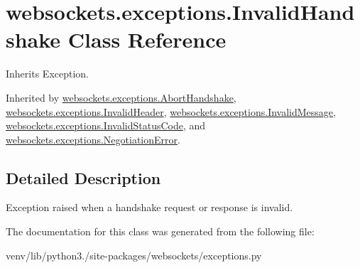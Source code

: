 \hypertarget{classwebsockets_1_1exceptions_1_1_invalid_handshake}{}\section{websockets.\+exceptions.\+Invalid\+Handshake Class Reference}
\label{classwebsockets_1_1exceptions_1_1_invalid_handshake}


Inherits Exception.



Inherited by \hyperlink{classwebsockets_1_1exceptions_1_1_abort_handshake}{websockets.\+exceptions.\+Abort\+Handshake}, \hyperlink{classwebsockets_1_1exceptions_1_1_invalid_header}{websockets.\+exceptions.\+Invalid\+Header}, \hyperlink{classwebsockets_1_1exceptions_1_1_invalid_message}{websockets.\+exceptions.\+Invalid\+Message}, \hyperlink{classwebsockets_1_1exceptions_1_1_invalid_status_code}{websockets.\+exceptions.\+Invalid\+Status\+Code}, and \hyperlink{classwebsockets_1_1exceptions_1_1_negotiation_error}{websockets.\+exceptions.\+Negotiation\+Error}.



\subsection{Detailed Description}
\begin{DoxyVerb}Exception raised when a handshake request or response is invalid.\end{DoxyVerb}
 

The documentation for this class was generated from the following file\+:\begin{DoxyCompactItemize}
\item 
venv/lib/python3./site-\/packages/websockets/exceptions.\+py\end{DoxyCompactItemize}

